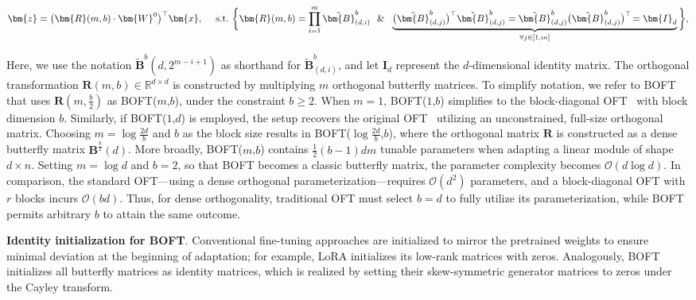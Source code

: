 \begin{equation}
    \begin{aligned}\nonumber
    \bm{z}=\big(\bm{R}(m,b)\cdot\bm{W}^0\big)^\top\bm{x},~~~~\text{s.t.}~\bigg{\{}\bm{R}(m,b)=\prod_{i=1}^m \tilde{\bm{B}}^b_{(d,i)}~~\&~~\underbrace{\big(\tilde{\bm{B}}^b_{(d,j)}\big)^\top\tilde{\bm{B}}^b_{(d,j)}=\tilde{\bm{B}}^b_{(d,j)}\big(\tilde{\bm{B}}^b_{(d,j)}\big)^\top\!=\bm{I}_d}_{\forall j\in [1, m]}\bigg{\}},
    \end{aligned}
\end{equation}

Here, we use the notation $\tilde{\bm{B}}^b(d,2^{m - i+1})$ as shorthand for $\tilde{\bm{B}}^b_{(d,i)}$, and let $\bm{I}_d$ represent the $d$-dimensional identity matrix. The orthogonal transformation $\bm{R}(m,b)\in\mathbb{R}^{d\times d}$ is constructed by multiplying $m$ orthogonal butterfly matrices. To simplify notation, we refer to BOFT that uses $\bm{R}(m,\frac{b}{2})$ as BOFT($m$,$b$), under the constraint $b\geq 2$. When $m=1$, BOFT($1$,$b$) simplifies to the block-diagonal OFT~\cite{qiu2023controlling} with block dimension $b$. Similarly, if BOFT($1$,$d$) is employed, the setup recovers the original OFT~\cite{qiu2023controlling} utilizing an unconstrained, full-size orthogonal matrix. Choosing $m=\log \frac{2d}{b}$ and $b$ as the block size results in BOFT($\log \frac{2d}{b}$,$b$), where the orthogonal matrix $\bm{R}$ is constructed as a dense butterfly matrix $\bm{B}^{\frac{b}{2}}(d)$. More broadly, BOFT($m$,$b$) contains $\frac{1}{2}(b-1)dm$ tunable parameters when adapting a linear module of shape $d\times n$. Setting $m=\log d$ and $b=2$, so that BOFT becomes a classic butterfly matrix, the parameter complexity becomes $\mathcal{O}(d\log d)$. In comparison, the standard OFT—using a dense orthogonal parameterization—requires $\mathcal{O}(d^2)$ parameters, and a block-diagonal OFT with $r$ blocks incurs $\mathcal{O}(bd)$. Thus, for dense orthogonality, traditional OFT must select $b=d$ to fully utilize its parameterization, while BOFT permits arbitrary $b$ to attain the same outcome.

\textbf{Identity initialization for BOFT}. Conventional fine-tuning approaches are initialized to mirror the pretrained weights to ensure minimal deviation at the beginning of adaptation; for example, LoRA initializes its low-rank matrices with zeros. Analogously, BOFT initializes all butterfly matrices as identity matrices, which is realized by setting their skew-symmetric generator matrices to zeros under the Cayley transform.

